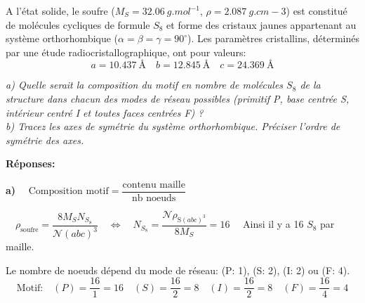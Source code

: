 \documentclass{article}
\begin{document}
A l'état solide, le soufre ($M_S = \qty{32.06}{g.mol^{-1}}$, $\rho = \qty{2.087}{g.cm-3}$)
est constitué de molécules cycliques de formule $S_8$ et forme des cristaux jaunes appartenant au système orthorhombique 
($\alpha=\beta=\gamma=90^{\circ}$). Les paramètres cristallins, déterminés par une
étude radiocristallographique, ont pour valeurs:
$$a = \qty{10.437}{\angstrom} \quad b = \qty{12.845}{\angstrom} \quad c = \qty{24.369}{\angstrom}$$ 

\vspace{5mm}\noindent \textit{a) Quelle serait la composition du motif en nombre de molécules $S_8$ de la structure
dans chacun des modes de réseau possibles (primitif P, base centrée S, intérieur centré I et 
toutes faces centrées F) ? }\\
\textit{b) Tracez les axes de symétrie du système orthorhombique. Préciser l'ordre de symétrie des axes.}

\vfill\noindent\textbf{Réponses:}

\textbf{a)} $\quad \text{Composition motif} = \dfrac{\text{contenu maille}}{\text{nb noeuds}}$

$\quad \rho_{\text{soufre}} = \dfrac{8 M_S N_{S_8}}{\mathcal{N}(a b c)^3}
\quad \Longleftrightarrow \quad N_{S_8}= \dfrac{\mathcal{N}\rho_{\text{S}(abc)^3}}{8M_S} = 16 \quad$
Ainsi il y a 16 $S_8$ par maille.

Le nombre de noeuds dépend du mode de réseau: (P: 1), (S: 2), (I: 2) ou (F: 4).
$$\text{Motif:} \quad (P) = \frac{16}{1}=16 \quad (S) = \frac{16}{2}=8 \quad (I) = \frac{16}{2}=8 \quad (F) = \frac{16}{4}=4$$



\clearpage
\end{document}
